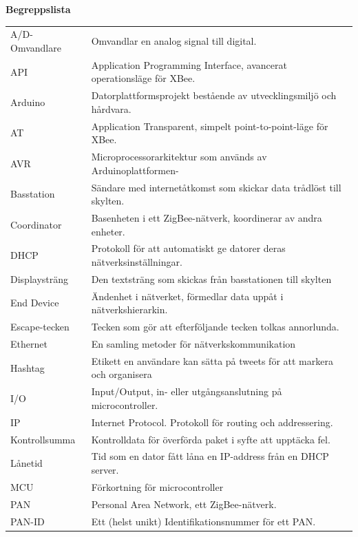 \documentclass[a4paper,11pt]{article}
\begin{document}
\thispagestyle{empty}
\pagebreak

\thispagestyle{empty}
\begin{center}
{\noindent \bf Begreppslista}\\
\end{center}

\begin{table}[h!]
\centering
	\begin{tabular}{|l|l|}
A/D-Omvandlare & Omvandlar en analog signal till digital.\\
API & Application Programming Interface, avancerat operationsläge för XBee.\\
Arduino & Datorplattformsprojekt bestående av utvecklingsmiljö och hårdvara.\\
AT & Application Transparent, simpelt point-to-point-läge för XBee.\\	
AVR & Microprocessorarkitektur som används av Arduinoplattformen-\\
Basstation & Sändare med internetåtkomst som skickar data trådlöst till skylten.\\
Coordinator & Basenheten i ett ZigBee-nätverk, koordinerar av andra enheter.\\
DHCP & Protokoll för att automatiskt ge datorer deras nätverksinställningar.\\
Displaysträng & Den textsträng som skickas från basstationen till skylten \\
End Device & Ändenhet i nätverket, förmedlar data uppåt i nätverkshierarkin.\\
Escape-tecken & Tecken som gör att efterföljande tecken tolkas annorlunda.\\
Ethernet & En samling metoder för nätverkskommunikation\\
Hashtag & Etikett en användare kan sätta på tweets för att markera och organisera\\
I/O & Input/Output, in- eller utgångsanslutning på microcontroller.\\
IP & Internet Protocol. Protokoll för routing och addressering.\\
Kontrollsumma & Kontrolldata för överförda paket i syfte att upptäcka fel.\\
Lånetid & Tid som en dator fått låna en IP-address från en DHCP server.\\
MCU & Förkortning för microcontroller \\
PAN & Personal Area Network, ett ZigBee-nätverk.\\
PAN-ID & Ett (helst unikt) Identifikationsnummer för ett PAN.\\

\end{tabular}
\end{table}
\end{document}
